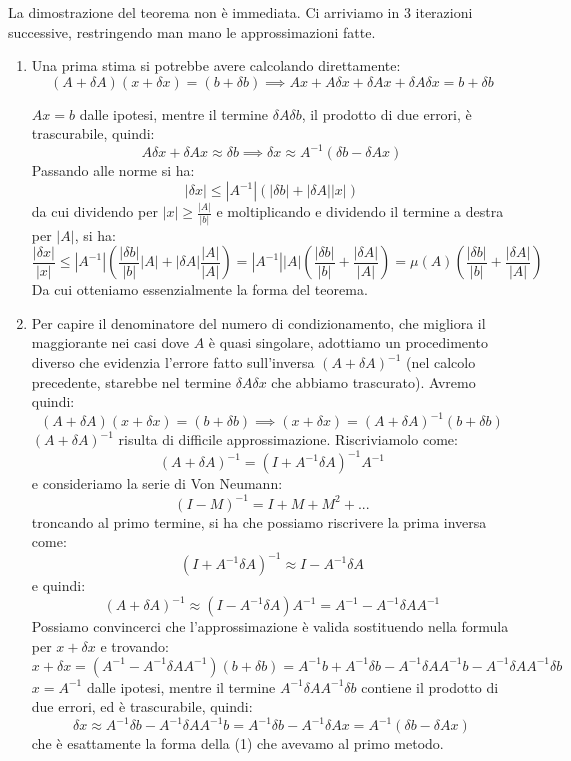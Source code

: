 \documentclass[a4paper,11pt]{article}
\begin{document}
La dimostrazione del teorema non è immediata.
Ci arriviamo in 3 iterazioni successive, restringendo man mano le approssimazioni fatte. 
\begin{enumerate}
	\item 
Una prima stima si potrebbe avere calcolando direttamente:
$$
(A + \delta A) (x + \delta x) = (b + \delta b) \implies Ax + A \delta x + \delta A x + \delta A \delta x = b + \delta b
$$

$Ax = b$ dalle ipotesi, mentre il termine $\delta A \delta b$, il prodotto di due errori, è trascurabile, quindi:
$$
A \delta x + \delta A x \approx \delta b \implies \delta x \approx A^{-1} \left( \delta b - \delta A x \right)
$$
Passando alle norme si ha:
\begin{equation}
| \delta x | \leq |A^{-1}| \left(|\delta b| + |\delta A| |x| \right)
\end{equation}
da cui dividendo per $|x| \geq \frac{|A|}{|b|}$ e moltiplicando e dividendo il termine a destra per $|A|$, si ha:
$$
\frac{|\delta x|}{|x|} \leq |A^{-1}| \left( \frac{|\delta b|}{|b|} |A| + |\delta A| \frac{|A|}{|A|} \right) = |A^{-1}| |A| \left( \frac{|\delta b|}{|b|} + \frac{|\delta A|}{|A|} \right) = \mu(A) \left( \frac{|\delta b|}{|b|} + \frac{|\delta A|}{|A|} \right)
$$
Da cui otteniamo essenzialmente la forma del teorema. 

\item
Per capire il denominatore del numero di condizionamento, che migliora il maggiorante nei casi dove $A$ è quasi singolare, adottiamo un procedimento diverso che evidenzia l'errore fatto sull'inversa $(A + \delta A)^{-1}$ (nel calcolo precedente, starebbe nel termine $\delta A \delta x$ che abbiamo trascurato).
Avremo quindi:
$$
(A + \delta A) (x + \delta x) = (b + \delta b) \implies (x + \delta x) = (A + \delta A)^{-1} (b + \delta b)
$$
$(A + \delta A)^{-1}$ risulta di difficile approssimazione.
Riscriviamolo come:
$$
(A + \delta A)^{-1} = (I + A^{-1} \delta A)^{-1} A^{-1}
$$
e consideriamo la serie di Von Neumann:
$$
(I - M)^{-1} = I + M + M^2 + ...
$$
troncando al primo termine, si ha che possiamo riscrivere la prima inversa come:
$$
(I + A^{-1} \delta A)^{-1} \approx I - A^{-1} \delta A 
$$
e quindi:
\begin{equation}
(A + \delta A)^{-1} \approx (I - A^{-1} \delta A ) A^{-1} = A^{-1} - A^{-1} \delta A A^{-1} 
\end{equation}
Possiamo convincerci che l'approssimazione è valida sostituendo nella formula per $x + \delta x$ e trovando:
$$
x + \delta x = (A^{-1} - A^{-1} \delta A A^{-1}) (b + \delta b) = A^{-1} b + A^{-1} \delta b - A^{-1} \delta A A^{-1} b - A^{-1} \delta A A^{-1} \delta b
$$
$x = A^{-1}$ dalle ipotesi, mentre il termine $A^{-1} \delta A A^{-1} \delta b$ contiene il prodotto di due errori, ed è trascurabile, quindi:
$$
\delta x \approx A^{-1} \delta b - A^{-1} \delta A A^{-1} b = A^{-1} \delta b - A^{-1} \delta A x = A^{-1} \left( \delta b - \delta A x \right)
$$
che è esattamente la forma della (1) che avevamo al primo metodo.


\end{enumerate}
\end{document}
